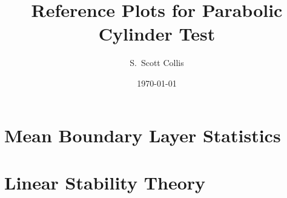 \documentclass[12pt, oneside]{amsart}
\title{Reference Plots for Parabolic Cylinder Test}
\author{S.\ Scott Collis}
\date{\today}
\begin{document}
\maketitle


\section{Mean Boundary Layer Statistics}

\begin{figure}[!hbt]
\centering

\end{figure}

\begin{figure}[!hbt]
\centering

\end{figure}

\begin{figure}[!htb]
\centering

\end{figure}

\begin{figure}[!htb]
\centering

\end{figure}

\begin{figure}[!htb]
\centering

\end{figure}

\begin{figure}[!htb]
\centering

\end{figure}


\section{Linear Stability Theory}

\begin{figure}[!htb]
\centering

\end{figure}

\begin{figure}[!htb]
\centering

\end{figure}

\begin{figure}[!htb]
\centering

\end{figure}

\begin{figure}[!htb]
\centering

\end{figure}
\end{document}
